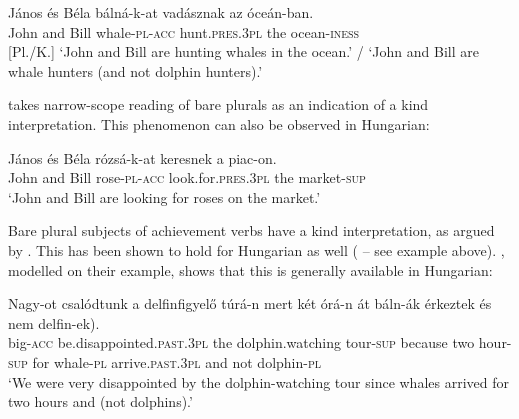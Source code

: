 \documentclass[output=paper]{langscibook}
\begin{document}

\ea \label{schv-nem:ex:40}
\gll János és Béla bálná-k-at vadásznak az óceán-ban.	\\
John and Bill whale-\textsc{pl}-\textsc{acc} hunt.\textsc{pres}.\textsc{3pl} the ocean-\textsc{iness}\\ \hfill [Pl./K.]
\glt `John and Bill are hunting whales in the ocean.' / `John and Bill are whale hunters (and not dolphin hunters).'
\z


\noindent \citet{carlson-77} takes narrow-scope reading of bare plurals as an indication of a kind interpretation. This phenomenon can also be observed in Hungarian:  

\ea \label{schv-nem:ex:41}
\gll János és Béla rózsá-k-at keresnek a piac-on.\\
John and Bill rose-\textsc{pl}-\textsc{acc} look.for.\textsc{pres}.\textsc{3pl} the market-\textsc{sup}\\
\glt `John and Bill are looking for roses on the market.' \\\hfill \citep[p. 203, (13)]{schvarcz-rothstein-17}
\z

\noindent Bare plural subjects of achievement verbs have a kind interpretation, as argued by \citet{landman-rothstein-10}. This has been shown to hold for Hungarian as well (\citealt{schvarcz-rothstein-17} -- see example  above). , modelled on their example, shows that this is generally available in Hungarian:

\ea \label{schv-nem:ex:42}
\gll Nagy-ot csalódtunk a delfinfigyelő túrá-n mert két órá-n át báln-ák érkeztek \minsp{(} és nem delfin-ek).\\
big-\textsc{acc} be.disappointed.\textsc{past}.\textsc{3pl} the dolphin.watching tour-\textsc{sup} because two hour-\textsc{sup} for  whale-\textsc{pl}  arrive.\textsc{past}.\textsc{3pl} {} and not dolphin-\textsc{pl}\\
\glt `We were very disappointed by the dolphin-watching tour since whales arrived for two hours and (not dolphins).'  
\z
\end{document}
